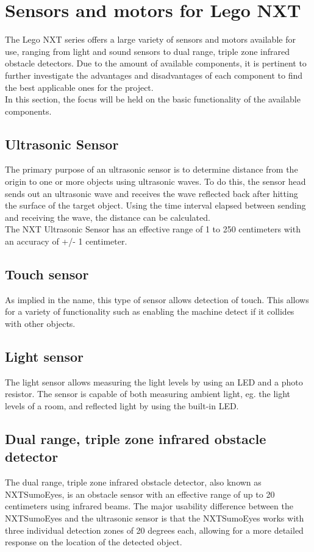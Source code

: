 \section{Sensors and motors for Lego NXT}
The Lego NXT series offers a large variety of sensors and motors available for use, ranging from light and sound sensors to dual range, triple zone infrared obstacle detectors.
Due to the amount of available components, it is pertinent to further investigate the advantages and disadvantages of each component to find the best applicable ones for the project.\\
In this section, the focus will be held on the basic functionality of the available components.

\subsection{Ultrasonic Sensor}
The primary purpose of an ultrasonic sensor is to determine distance from the origin to one or more objects using ultrasonic waves.
To do this, the sensor head sends out an ultrasonic wave and receives the wave reflected back after hitting the surface of the target object.
Using the time interval elapsed between sending and receiving the wave, the distance can be calculated.\\
The NXT Ultrasonic Sensor has an effective range of 1 to 250 centimeters with an accuracy of +/- 1 centimeter.

\subsection{Touch sensor}
As implied in the name, this type of sensor allows detection of touch.
This allows for a variety of functionality such as enabling the machine detect if it collides with other objects.

\subsection{Light sensor}
The light sensor allows measuring the light levels by using an LED and a photo resistor.
The sensor is capable of both measuring ambient light, eg. the light levels of a room, and reflected light by using the built-in LED.

\subsection{Dual range, triple zone infrared obstacle detector}
The dual range, triple zone infrared obstacle detector, also known as NXTSumoEyes, is an obstacle sensor with an effective range of up to 20 centimeters using infrared beams. 
The major usability difference between the NXTSumoEyes and the ultrasonic sensor is that the NXTSumoEyes works with three individual detection zones of 20 degrees each, allowing for a more detailed response on the location of the detected object.


